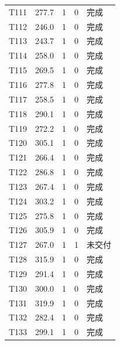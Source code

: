 \documentclass[a4paper,11pt]{article}
\begin{document}
\begin{table}[htbp]
\begin{tabular}{rcccl}
T111 & 277.7 & 1 & 0 & 完成 \\
T112 & 246.0 & 1 & 0 & 完成 \\
T113 & 243.7 & 1 & 0 & 完成 \\
T114 & 258.0 & 1 & 0 & 完成 \\
T115 & 269.5 & 1 & 0 & 完成 \\
T116 & 277.8 & 1 & 0 & 完成 \\
T117 & 258.5 & 1 & 0 & 完成 \\
T118 & 290.1 & 1 & 0 & 完成 \\
T119 & 272.2 & 1 & 0 & 完成 \\
T120 & 305.1 & 1 & 0 & 完成 \\
T121 & 266.4 & 1 & 0 & 完成 \\
T122 & 286.8 & 1 & 0 & 完成 \\
T123 & 267.4 & 1 & 0 & 完成 \\
T124 & 303.2 & 1 & 0 & 完成 \\
T125 & 275.8 & 1 & 0 & 完成 \\
T126 & 305.9 & 1 & 0 & 完成 \\
T127 & 267.0 & 1 & 1 & 未交付 \\
T128 & 315.9 & 1 & 0 & 完成 \\
T129 & 291.4 & 1 & 0 & 完成 \\
T130 & 300.0 & 1 & 0 & 完成 \\
T131 & 319.9 & 1 & 0 & 完成 \\
T132 & 282.4 & 1 & 0 & 完成 \\
T133 & 299.1 & 1 & 0 & 完成 \\
\bottomrule
\end{tabular}
\end{table}
\end{document}
